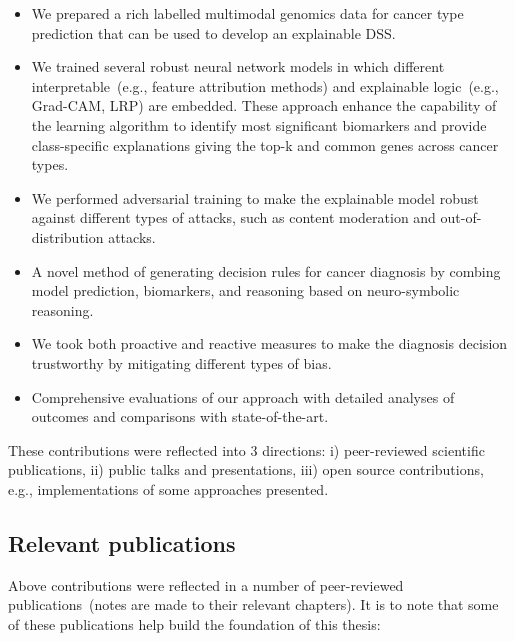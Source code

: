 \begin{itemize}[noitemsep]
    \item We prepared a rich labelled multimodal genomics data for cancer type prediction that can be used to develop an explainable DSS.  
    \item We trained several robust neural network models in which different interpretable~(e.g., feature attribution methods) and explainable logic~(e.g., Grad-CAM, LRP) are embedded. These approach enhance the capability of the learning algorithm to identify most significant biomarkers and provide class-specific explanations giving the top-k and common genes across cancer types. 
    \item We performed adversarial training to make the explainable model robust against different types of attacks, such as content moderation and out-of-distribution attacks. 
    \item A novel method of generating decision rules for cancer diagnosis by combing model prediction, biomarkers, and reasoning based on neuro-symbolic reasoning. 
    \item We took both proactive and reactive measures to make the diagnosis decision trustworthy by mitigating different types of bias. 
    \item Comprehensive evaluations of our approach with detailed analyses of outcomes and comparisons with state-of-the-art. 
\end{itemize}

\hspace*{3.5mm} These contributions were reflected into 3 directions: i) peer-reviewed scientific publications, ii) public talks and presentations, iii) open source contributions, e.g., implementations of some approaches presented. %

\subsection{Relevant publications}
Above contributions were reflected in a number of peer-reviewed publications~(notes are made to their relevant chapters). It is to note that some of these publications help build the foundation of this thesis: 

